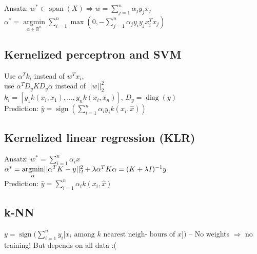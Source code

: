 Ansatz: $w^* \in \operatorname{span}(X) \Rightarrow w = \sum_{j=1}^n \alpha_j y_j x_j$\\
$\alpha^*= \underset{\alpha \in \mathbb{R}^n}{\operatorname{argmin}} \sum_{i=1}^n \operatorname{max}(0, - \sum_{j=1}^n \alpha_j y_i y_j x_i^T x_j)$

\subsection*{Kernelized perceptron and SVM}
Use $\alpha^T k_i$ instead of $w^T x_i$,\\
use $\alpha^T D_y K D_y \alpha$ instead of $||w||_2^2$\\ 
$k_i=[y_1 k(x_i,x_1), ..., y_n k(x_i,x_n)]$, $D_y = \operatorname{diag}(y)$\\
Prediction: $\hat{y} = \operatorname{sign}(\sum_{i=1}^n \alpha_i y_i k(x_i, \hat{x}))$

\subsection*{Kernelized linear regression (KLR)}
Ansatz: $w^*=\sum_{i = 1}^n \alpha_i x$\\
$\alpha^*= \underset{\alpha}{\operatorname{argmin}} ||\alpha^T K - y||_2^2 + \lambda \alpha^T K \alpha \\= (K+\lambda I)^{-1} y$\\
Prediction: $\hat{y} = \sum \limits_{i=1}^n \alpha_i k(x_i,\hat{x})$

\subsection*{k-NN}
$y = \operatorname{sign} \big( \sum_{i=1}^n y_i [x_i \text{ among } k \text{ nearest neigh-}$ $\text{bours of } x] \big)$ --
No weights $\Rightarrow$ no training! But depends on all data :(